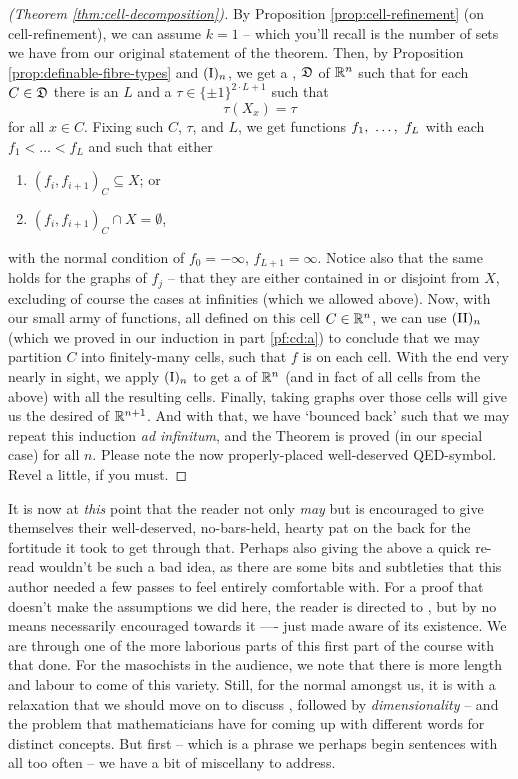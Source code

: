 \begin{proof}[\CD (Theorem \ref{thm:cell-decomposition})]
    By Proposition \ref{prop:cell-refinement} (on cell-refinement), we can assume $k = 1$ -- which you'll recall is the number of sets we have from our original statement of the theorem. Then, by Proposition \ref{prop:definable-fibre-types} and $(\textrm{I})_{n}$, we get a \cd, $\mathfrak{D}$ of $\mathbb{R}^n$ such that for each $C \in \mathfrak{D}$ there is an $L$ and a $\tau \in \{\pm 1\}^{2 \cdot L + 1} $ such that
    $$
      \tau(X_x) = \tau
    $$
    for all $x \in C$. Fixing such $C$, $\tau$, and $L$, we get  functions $f_1, \ \hdots, \ f_{L}$ with each $f_1 < \hdots < f_L$ and such that either
    \begin{enumerate}
      \item $(f_i, f_{i+1})_C \subseteq X$; or
      \item $(f_i, f_{i+1})_C \cap X = \emptyset$,
    \end{enumerate}
    with the normal condition of $f_0 = - \infty$, $f_{L+1} = \infty$. Notice also that the same holds for the graphs of $f_j$ -- that they are either contained in or disjoint from $X$, excluding of course the cases at infinities (which we allowed above). Now, with our small army of  functions, all defined on this cell $C \in \mathbb{R}^n$, we can use $(\textrm{II})_{n}$ (which we proved in our induction in part \ref{pf:cd:a}) to conclude that we may partition $C$ into finitely-many cells, such that $f$ is \cont on each cell. With the end very nearly in sight, we apply $(\textrm{I})_{n}$ to get a \cd of $\mathbb{R}^n$ (and in fact of all cells from the above) \cmptble with all the resulting cells. Finally, taking graphs over those cells will give us the desired \cd of $\mathbb{R}^{n+1}$. And with that, we have `bounced back' such that we may repeat this induction \textit{ad infinitum}, and the \CD Theorem is proved (in our special case) for all $n$. Please note the now properly-placed well-deserved QED-symbol. Revel a little, if you must.
\end{proof}


It is now at \emph{this} point that the reader not only \emph{may} but is encouraged to give themselves their well-deserved, no-bars-held, hearty pat on the back for the fortitude it took to get through that. Perhaps also giving the above a quick re-read wouldn't be such a bad idea, as there are some bits and subtleties that this author needed a few passes to feel entirely comfortable with. For a proof that doesn't make the assumptions we did here, the reader is directed to \cite{knight_definable_1986}, but by no means necessarily encouraged towards it —- just made aware of its existence. We are through one of the more laborious parts of this first part of the course with that done. For the masochists in the audience, we note that there is more length and labour to come of this variety. Still, for the normal amongst us, it is with a relaxation that we should move on to discuss \emph{}, followed by \emph{dimensionality} -- and the problem that mathematicians have for coming up with different words for distinct concepts. But first -- which is a phrase we perhaps begin sentences with all too often -- we have a bit of miscellany to address.
